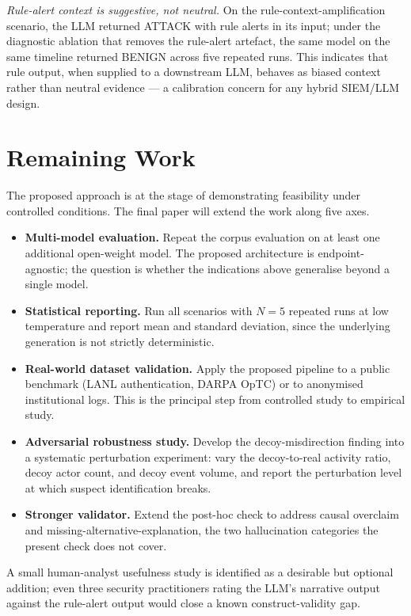 \documentclass[conference]{IEEEtran}
\begin{document}
\textit{Rule-alert context is suggestive, not neutral.} On the rule-context-amplification scenario, the LLM returned ATTACK with rule alerts in its input; under the diagnostic ablation that removes the rule-alert artefact, the same model on the same timeline returned BENIGN across five repeated runs. This indicates that rule output, when supplied to a downstream LLM, behaves as biased context rather than neutral evidence --- a calibration concern for any hybrid SIEM/LLM design.

\section{Remaining Work}
\label{sec:future}

The proposed approach is at the stage of demonstrating feasibility under controlled conditions. The final paper will extend the work along five axes.

\begin{itemize}
\item \textbf{Multi-model evaluation.} Repeat the corpus evaluation on at least one additional open-weight model. The proposed architecture is endpoint-agnostic; the question is whether the indications above generalise beyond a single model.
\item \textbf{Statistical reporting.} Run all scenarios with $N{=}5$ repeated runs at low temperature and report mean and standard deviation, since the underlying generation is not strictly deterministic.
\item \textbf{Real-world dataset validation.} Apply the proposed pipeline to a public benchmark (LANL authentication, DARPA OpTC) or to anonymised institutional logs. This is the principal step from controlled study to empirical study.
\item \textbf{Adversarial robustness study.} Develop the decoy-misdirection finding into a systematic perturbation experiment: vary the decoy-to-real activity ratio, decoy actor count, and decoy event volume, and report the perturbation level at which suspect identification breaks.
\item \textbf{Stronger validator.} Extend the post-hoc check to address causal overclaim and missing-alternative-explanation, the two hallucination categories the present check does not cover.
\end{itemize}

A small human-analyst usefulness study is identified as a desirable but optional addition; even three security practitioners rating the LLM's narrative output against the rule-alert output would close a known construct-validity gap.
\end{document}
